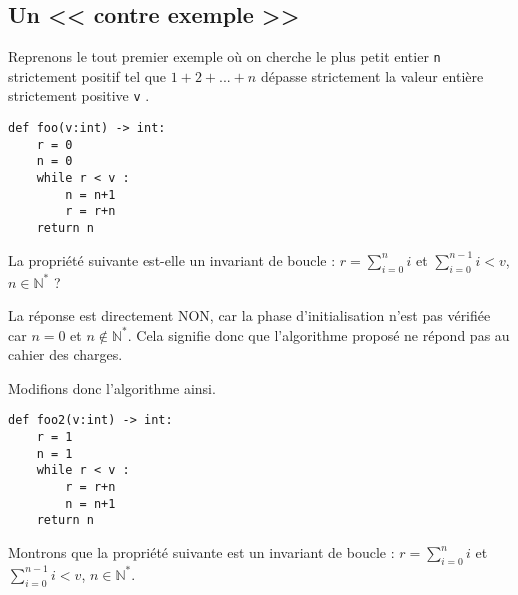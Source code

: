 \subsection{Un << contre exemple >>}


Reprenons le tout premier exemple où on cherche le plus petit entier \texttt{n} strictement positif tel que $1 + 2 + . . . + n$ dépasse strictement la valeur entière strictement positive \texttt{v} .
\begin{lstlisting}
def foo(v:int) -> int:
    r = 0
    n = 0
    while r < v : 
        n = n+1
        r = r+n
    return n
\end{lstlisting}

La propriété suivante est-elle un invariant de boucle : 
$r=\sum\limits_{i=0}^n i$ et 
$\sum\limits_{i=0}^{n-1} i < v$, 
$n\in\mathbb{N}^*$ ?

La réponse est directement NON, car la phase d'initialisation n'est pas vérifiée car $n=0$ et $n\notin\mathbb{N}^*$.
Cela signifie donc que l'algorithme proposé ne répond pas au cahier des charges. 

Modifions donc l'algorithme ainsi.
\begin{lstlisting}
def foo2(v:int) -> int:
    r = 1
    n = 1
    while r < v : 
        r = r+n
        n = n+1
    return n
\end{lstlisting}

Montrons que la propriété suivante est un invariant de boucle : $r=\sum\limits_{i=0}^n i$ et 
$\sum\limits_{i=0}^{n-1} i < v$, 
$n\in\mathbb{N}^*$.

